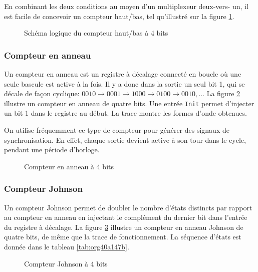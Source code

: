 \documentclass[11pt]{article}
\begin{document}
En combinant les deux conditions au moyen d'un multiplexeur deux-vers-
un, il est facile de concevoir un compteur haut/bas, tel qu'illustré
sur la figure \ref{fig:orge74b652}.

\begin{figure}[htbp]
\centering

\caption{\label{fig:orge74b652}Schéma logique du compteur haut/bas à 4 bits}
\end{figure}

\subsubsection{Compteur en anneau}
\label{sec:orgf780efd}

Un compteur en anneau est un registre à décalage connecté en boucle où
une seule bascule est active à la fois. Il y a donc dans la sortie un
seul bit 1, qui se décale de façon cyclique: \(0010 \rightarrow 0001
\rightarrow 1000 \rightarrow 0100 \rightarrow 0010, \ldots\) La
figure \ref{fig:orga39395e} illustre un compteur en anneau de quatre bits. Une
entrée \texttt{Init} permet d'injecter un bit 1 dans le registre au début. La
trace montre les formes d'onde obtenues.

On utilise fréquemment ce type de compteur pour générer des signaux de
synchronisation. En effet, chaque sortie devient active à son tour
dans le cycle, pendant une période d'horloge.

\begin{figure}[htbp]
\centering

\caption{\label{fig:orga39395e}Compteur en anneau à 4 bits}
\end{figure}

\subsubsection{Compteur Johnson}
\label{sec:orgaab2fb8}

Un compteur Johnson permet de doubler le nombre d'états distincts par
rapport au compteur en anneau en injectant le complément du dernier
bit dans l'entrée du registre à décalage.  La figure \ref{fig:orgc70634a}
illustre un compteur en anneau Johnson de quatre bits, de même que la
trace de fonctionnement. La séquence d'états est donnée dans le
tableau \ref{tab:org40a147b}.


\begin{figure}[htbp]
\centering

\caption{\label{fig:orgc70634a}Compteur Johnson à 4 bits}
\end{figure}
\end{document}
